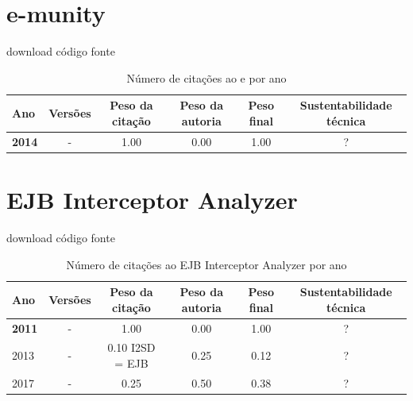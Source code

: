 \section{e-munity}
\checkmark download
\checkmark código fonte



\begin{table}[H]
\caption{Número de citações ao e por ano}
\centering
\begin{tabular}{| l | c | c | c | c | c |}
  \hline
  Ano & Versões & Peso da citação & Peso da autoria & Peso final & Sustentabilidade técnica \\
  \hline
            {\bf 2014}
          &
          -
          &
          1.00
          &
          0.00
          &
            {\color{blue} 1.00}
          &
          ?
          \\
\hline
\end{tabular}
\end{table}



\section{EJB Interceptor Analyzer}
\checkmark download
\checkmark código fonte



\begin{table}[H]
\caption{Número de citações ao EJB Interceptor Analyzer por ano}
\centering
\begin{tabular}{| l | c | c | c | c | c |}
  \hline
  Ano & Versões & Peso da citação & Peso da autoria & Peso final & Sustentabilidade técnica \\
  \hline
            {\bf 2011}
          &
          -
          &
          1.00
          &
          0.00
          &
            {\color{blue} 1.00}
          &
          ?
          \\
\hline
            2013
          &
          -
          &
          0.10
            {\tiny I2SD = EJB}
          &
          0.25
          &
            {\color{red} 0.12}
          &
          ?
          \\
\hline
            2017
          &
          -
          &
          0.25
          &
          0.50
          &
            {\color{red} 0.38}
          &
          ?
          \\
\hline
\end{tabular}
\end{table}



